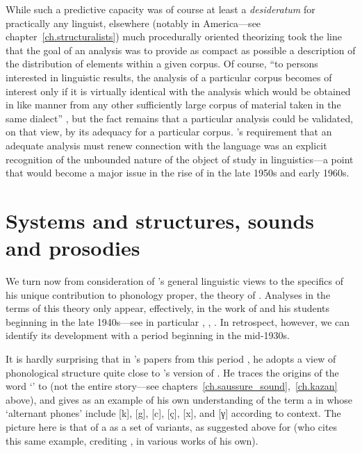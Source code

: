 While such a predictive capacity was of course at least a
\emph{desideratum} for practically any linguist, elsewhere (notably in
America—see chapter~\ref{ch.structuralists}) much procedurally
oriented theorizing took the line that the goal of an analysis was to
provide as compact as possible a description of the distribution of
elements within a given corpus. Of course, ``to persons interested in
linguistic results, the analysis of a particular corpus becomes of
interest only if it is virtually identical with the analysis which
would be obtained in like manner from any other sufficiently large
corpus of material taken in the same dialect'' \citep{harris:methods},
but the fact remains that a particular analysis could be validated, on
that view, by its adequacy for a particular corpus. {\Firth}'s
requirement that an adequate analysis must renew connection with the
language was an explicit recognition of the unbounded nature of the
object of study in linguistics—a point that would become a major issue
in the rise of  in the late 1950s and early 1960s.

\section{Systems and structures, sounds and prosodies}

We turn now from consideration of {\Firth}'s general linguistic views to
the speci\-fics of his unique contribution to phonology proper, the
theory of . Analyses in the terms of this theory only
appear, effectively, in the work of {\Firth} and his students beginning
in the late 1940s—see in particular \citet{firth48:sounds:prosodies},
\citet{henderson48:lushai,henderson49:siamese},
\citet{scott48:monosyllable}. In retrospect, however, we can identify
its development with a period beginning in the mid-1930s.

It is hardly surprising that in {\Firth}'s papers from this period 
\citep{firth34:notation,firth34:phoneme,firth35:distribution}, he
adopts a view of phonological structure quite close to 's
version of . He traces the origins of the word
`' to {\Kruszewski} (not the entire story—see
chapters~\ref{ch.saussure_sound},~\ref{ch.kazan} above), and gives as
an example of his own understanding of the term a  in 
whose `alternant phones' include [k], [g], [c], [ç], [x], and [γ]
according to context. The picture here is that of a  as a set
of variants, as suggested above for {\Jones} (who cites this same
example, crediting {\Firth}, in various works of his own).

